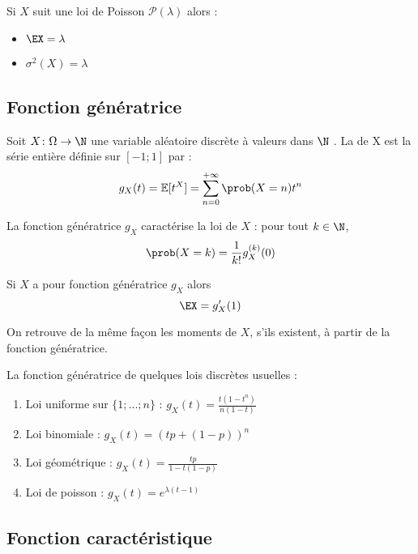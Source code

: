 \begin{proposition}{}{}
	Si $X$ suit une loi de Poisson $\mathscr{P}(\lambda)$ alors :
	\begin{itemize}
		\item $\EX = \lambda$
		\item $\sigma^2(X)=\lambda$
	\end{itemize}
\end{proposition}

\subsection{Fonction génératrice}

\begin{definition}{}{}
	Soit $X \colon \Omega \to \N $ une variable aléatoire discrète à valeurs dans $\N$ .  La  de X est la série entière définie sur $[-1;1]$ par :
	$$g_X(t)=\mathbb{E}[t^X] =\sum _{n=0} ^{+\infty} \prob(X=n)t^n$$
	
\end{definition}

\begin{proposition}{}{}
	La fonction génératrice $g_X$ caractérise la loi de $X$ : pour tout $k \in \N $, 
	$$\prob(X=k)=\frac{1}{k!}g_X^{(k)}(0)$$
\end{proposition}

\begin{proposition}{}{}
	Si $X$ a pour fonction génératrice $g_X$  alors 
	$$\EX = g_X'(1)$$
\end{proposition}

On retrouve de la même façon les moments de $X$, s'ils existent, à partir de la fonction génératrice.

\begin{exemple}{}{}
	La fonction génératrice de quelques lois discrètes usuelles :
	\begin{enumerate}
		\item Loi uniforme sur $\{1;...;n\}$ : $g_X(t)=  \frac{t(1-t^n)}{n(1-t)}$
		\item Loi binomiale : $g_X(t)=  (tp + (1-p))^n$
		\item Loi géométrique : $g_X(t)=  \frac{tp}{1-t(1-p)}$
		\item Loi de poisson : $g_X(t) = e^{\lambda(t-1)}$
	\end{enumerate}
\end{exemple}


\subsection{Fonction caractéristique}

